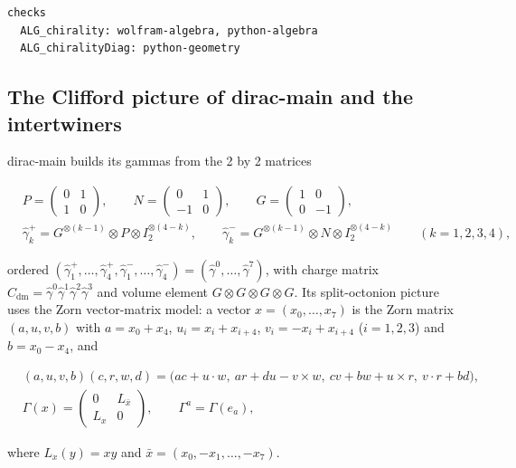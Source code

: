 \documentclass[11pt]{article}
\begin{document}
\begin{Verbatim}[fontsize=\small]
checks
  ALG_chirality: wolfram-algebra, python-algebra
  ALG_chiralityDiag: python-geometry
\end{Verbatim}

\subsection{The Clifford picture of dirac-main and the intertwiners}

dirac-main builds its gammas from the 2 by 2 matrices

\[
\begin{aligned}
&P=\begin{pmatrix}0&1\\ 1&0\end{pmatrix},\qquad N=\begin{pmatrix}0&1\\ -1&0\end{pmatrix},\qquad G=\begin{pmatrix}1&0\\ 0&-1\end{pmatrix},\\
&\hat\gamma_k^{+}=G^{\otimes(k-1)}\otimes P\otimes I_2^{\otimes(4-k)},\qquad \hat\gamma_k^{-}=G^{\otimes(k-1)}\otimes N\otimes I_2^{\otimes(4-k)}\qquad(k=1,2,3,4),
\end{aligned}
\]

ordered $(\hat\gamma_1^+,\dots,\hat\gamma_4^+,\hat\gamma_1^-,\dots,\hat\gamma_4^-)=(\hat\gamma^0,\dots,\hat\gamma^7)$, with charge matrix $C_{\mathrm{dm}}=\hat\gamma^0\hat\gamma^1\hat\gamma^2\hat\gamma^3$ and volume element $G\otimes G\otimes G\otimes G$. Its split-octonion picture uses the Zorn vector-matrix model: a vector $x=(x_0,\dots,x_7)$ is the Zorn matrix $(a,u,v,b)$ with $a=x_0+x_4$, $u_i=x_i+x_{i+4}$, $v_i=-x_i+x_{i+4}$ ($i=1,2,3$) and $b=x_0-x_4$, and

\[
\begin{aligned}
&(a,u,v,b)(c,r,w,d)=\bigl(ac+u\cdot w,\ ar+du-v\times w,\ cv+bw+u\times r,\ v\cdot r+bd\bigr),\\
&\Gamma(x)=\begin{pmatrix}0&L_{\bar x}\\ L_x&0\end{pmatrix},\qquad \Gamma^a=\Gamma(e_a),
\end{aligned}
\]

where $L_x(y)=xy$ and $\bar x=(x_0,-x_1,\dots,-x_7)$.
\end{document}
